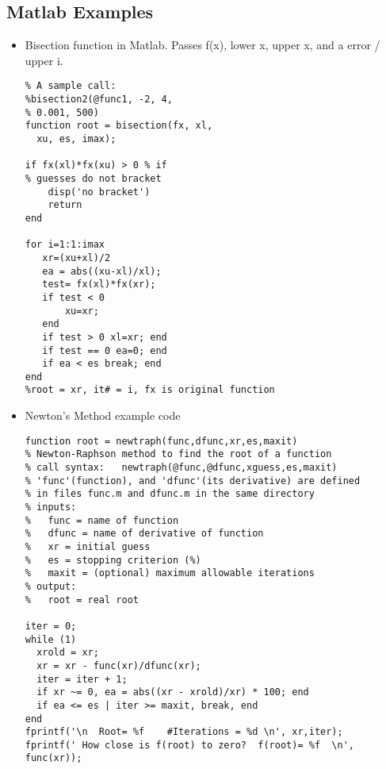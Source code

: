 \documentclass[fontsize=5pt]{scrartcl}
\begin{document}
\begin{multicols}{3}
    \subsection{Matlab Examples}
      \begin{itemize}
        \item Bisection function in Matlab. Passes f(x), lower x, upper x, and a error / upper i.
          \lstset{language=Matlab,basicstyle=\footnotesize,breaklines=true}
        \begin{lstlisting}
% A sample call:
%bisection2(@func1, -2, 4,
% 0.001, 500)
function root = bisection(fx, xl,
  xu, es, imax);

if fx(xl)*fx(xu) > 0 % if 
% guesses do not bracket
    disp('no bracket')
    return
end

for i=1:1:imax
   xr=(xu+xl)/2
   ea = abs((xu-xl)/xl);
   test= fx(xl)*fx(xr);
   if test < 0
       xu=xr;
   end
   if test > 0 xl=xr; end
   if test == 0 ea=0; end
   if ea < es break; end
end
%root = xr, it# = i, fx is original function
        \end{lstlisting}
        \item Newton's Method example code
          \lstset{language=Matlab,basicstyle=\footnotesize,breaklines=true}
          \begin{lstlisting}
function root = newtraph(func,dfunc,xr,es,maxit)
% Newton-Raphson method to find the root of a function
% call syntax:   newtraph(@func,@dfunc,xguess,es,maxit)
% 'func'(function), and 'dfunc'(its derivative) are defined 
% in files func.m and dfunc.m in the same directory
% inputs:
%   func = name of function 
%   dfunc = name of derivative of function 
%   xr = initial guess
%   es = stopping criterion (%)
%   maxit = (optional) maximum allowable iterations
% output:
%   root = real root

iter = 0;
while (1)
  xrold = xr;
  xr = xr - func(xr)/dfunc(xr);
  iter = iter + 1;
  if xr ~= 0, ea = abs((xr - xrold)/xr) * 100; end
  if ea <= es | iter >= maxit, break, end
end
fprintf('\n  Root= %f    #Iterations = %d \n', xr,iter);
fprintf(' How close is f(root) to zero?  f(root)= %f  \n', func(xr));
          \end{lstlisting}
        \end{itemize}

\end{multicols}
\end{document}
